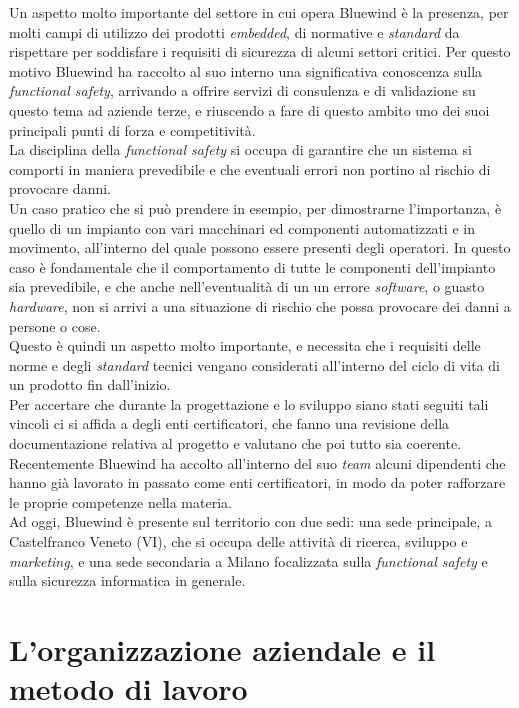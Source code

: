 \hypertarget{ref:spiegazione_fun_saf}{}
\noindent
Un aspetto molto importante del settore in cui opera Bluewind è la presenza, per molti campi di utilizzo dei prodotti \textit{embedded}, di normative e \textit{standard} da rispettare per soddisfare i requisiti di sicurezza di alcuni settori critici.
Per questo motivo Bluewind ha raccolto al suo interno una significativa conoscenza sulla \textit{functional safety}, arrivando a offrire servizi di consulenza e di validazione su questo tema ad aziende terze, e riuscendo a fare di questo ambito uno dei suoi principali punti di forza e competitività.\\
La disciplina della \textit{functional safety} si occupa di garantire che un sistema si comporti in maniera prevedibile e che eventuali errori non portino al rischio di provocare danni.\\
Un caso pratico che si può prendere in esempio, per dimostrarne l'importanza, è quello di un impianto con vari macchinari ed componenti automatizzati e in movimento, all'interno del quale possono essere presenti degli operatori.
In questo caso è fondamentale che il comportamento di tutte le componenti dell'impianto sia prevedibile, e che anche nell'eventualità di un un errore \textit{software}, o guasto \textit{hardware}, non si arrivi a una situazione di rischio che possa provocare dei danni a persone o cose.\\
Questo è quindi un aspetto molto importante, e necessita che i requisiti delle norme e degli \textit{standard} tecnici vengano considerati all'interno del ciclo di vita di un prodotto fin dall'inizio.\\
Per accertare che durante la progettazione e lo sviluppo siano stati seguiti tali vincoli ci si affida a degli enti certificatori, che fanno una revisione della documentazione relativa al progetto e valutano che poi tutto sia coerente.
Recentemente Bluewind ha accolto all'interno del suo \textit{team} alcuni dipendenti che hanno già lavorato in passato come enti certificatori, in modo da poter rafforzare le proprie competenze nella materia.\\

\noindent
Ad oggi, Bluewind è presente sul territorio con due sedi: una sede principale, a Castelfranco Veneto (VI), che si occupa delle attività di ricerca, sviluppo e \textit{marketing}, e una sede secondaria a Milano focalizzata sulla \textit{functional safety} e sulla sicurezza informatica in generale.


\section{L'organizzazione aziendale e il metodo di lavoro}

